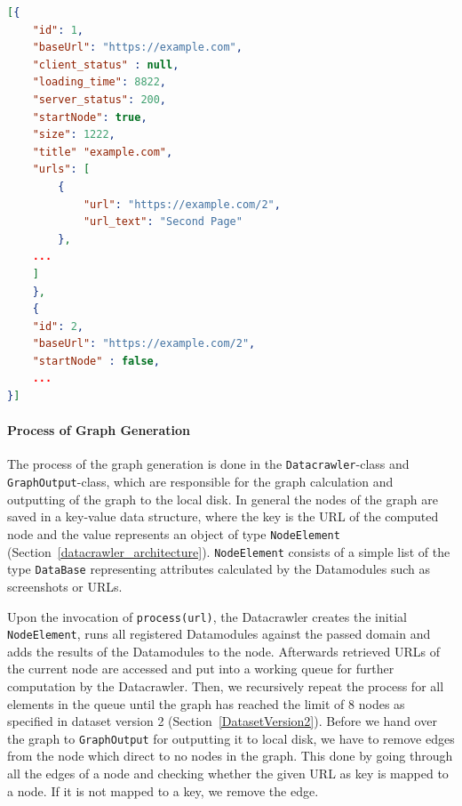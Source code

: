 \begin{lstlisting}[language=json,firstnumber=1,label={lst:examplecom_graph},
    language=Python,
    caption={[Example graph generated by the Datacrawler]Graph output for the domain \texttt{example.com}. The graph nodes are \texttt{json}-objects in the root array of the \texttt{json}-file. The \texttt{baseUrl}-attribute shows affiliation of the node to the given URL. Futhermore, each \texttt{json}-object consists of attributes mainly calculated in the URL-Datamodule such as client-sided and server-sided error (here: \texttt{client\_status} and \texttt{server\_status}), loading time, size and finally the valid URLs with the URL text. In general, all URLs found in the nodes are represented as nodes in the graph. Finally, each computed URL has an ID assigned, which represents respectively the name of the screenshots for the URL.},
    captionpos=b]
[{
	"id": 1,
	"baseUrl": "https://example.com",
	"client_status" : null,
	"loading_time": 8822,
	"server_status": 200,
	"startNode": true,
	"size": 1222,
	"title" "example.com",
	"urls": [
		{
			"url": "https://example.com/2",
			"url_text": "Second Page"
		},
	...
	]
	},
	{
	"id": 2,
	"baseUrl": "https://example.com/2",
	"startNode" : false,
	...
}]
\end{lstlisting}

\paragraph*{Process of Graph Generation} 
The process of the graph generation is done in the \texttt{Datacrawler}-class and \texttt{GraphOutput}-class, which are responsible for the graph calculation and outputting of the graph to the local disk. In general the nodes of the graph are saved in a key-value data structure, where the key is the URL of the computed node and the value represents an object of type \texttt{NodeElement} (Section~\ref{datacrawler_architecture}). \texttt{NodeElement} consists of a simple list of the type \texttt{DataBase} representing attributes calculated by the Datamodules such as screenshots or URLs.

Upon the invocation of \texttt{process(url)}, the Datacrawler creates the initial \texttt{NodeElement}, runs all registered Datamodules against the passed domain and adds the results of the Datamodules to the node. Afterwards retrieved URLs of the current node are accessed and put into a working queue for further computation by the Datacrawler. Then, we recursively repeat the process for all elements in the queue until the graph has reached the limit of 8 nodes as specified in dataset version 2 (Section~\ref{DatasetVersion2}). Before we hand over the graph to \texttt{GraphOutput} for outputting it to local disk, we have to remove edges from the node which direct to no nodes in the graph. This done by going through all the edges of a node and checking whether the given URL as key is mapped to a node. If it is not mapped to a key, we remove the edge.

